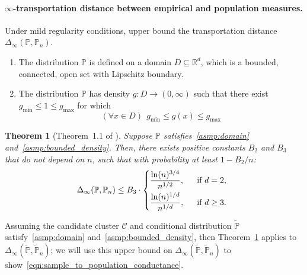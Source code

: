 \documentclass{article}
\newcommand{\Reals}{\mathbb{R}}
\newcommand{\1}{\mathbf{1}}
\newcommand{\Rd}{\Reals^d}
\newcommand{\mc}[1]{\mathcal{#1}}
\newcommand{\mbb}[1]{\mathbb{#1}}
\newcommand{\Pbb}{\mathbb{P}}
\newcommand{\wt}[1]{\widetilde{#1}}
\newtheorem{theorem}{Theorem}[section]
\theoremstyle{definition}
\theoremstyle{remark}
\begin{document}
\paragraph{$\infty$-transportation distance between empirical and population measures.}
Under mild regularity conditions, \cite{garciatrillos16b} upper bound the transportation distance $\Delta_{\infty}(\mbb{P},\mbb{P}_n)$. 
\begin{enumerate}[label=(A\arabic*)]
	\item 
	\label{asmp:domain} 
	The distribution $\Pbb$ is defined on a domain $D \subseteq \Rd$, which is a bounded, connected, open set with Lipschitz boundary. 
	\item 
	\label{asmp:bounded_density} 
	The distribution $\Pbb$ has density $g: D \to (0,\infty)$ such that there exist $g_{\min} \leq 1 \leq g_{\max}$ for which
	\begin{equation*}
	(\forall x \in D)~~ g_{\min} \leq g(x) \leq g_{\max}
	\end{equation*}
\end{enumerate}
\begin{theorem}[Theorem~1.1 of \cite{garciatrillos16}]
	\label{thm:garciatrillos16}
	Suppose $\Pbb$ satisfies~\ref{asmp:domain} and~\ref{asmp:bounded_density}. Then, there exists positive constants $B_{2}$ and $B_3$ that do not depend on $n$, such that with probability at least $1 - B_2/n$:
	\begin{equation*}
	\Delta_{\infty}(\mbb{P},\mbb{P}_n) \leq B_{3} \cdot 
	\begin{dcases*}
	\frac{\ln(n)^{3/4}}{n^{1/2}},&~~\textrm{if $d = 2$,} \\
	\frac{\ln(n)^{1/d}}{n^{1/d}},&~~\textrm{if $d \geq 3$.}
	\end{dcases*}
	\end{equation*}
\end{theorem}
Assuming the candidate cluster $\mc{C}$ and conditional distribution $\wt{\Pbb}$ satisfy~\ref{asmp:domain} and~\ref{asmp:bounded_density}, then Theorem~\ref{thm:garciatrillos16} applies to $\Delta_{\infty}(\wt{\Pbb},\wt{\Pbb}_n)$; we will use this upper bound on $\Delta_{\infty}(\wt{\Pbb},\wt{\Pbb}_n)$ to show~\eqref{eqn:sample_to_population_conductance}.  
\end{document}
